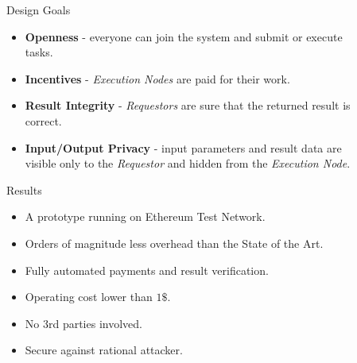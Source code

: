 \documentclass[final]{beamer}
\newlength{\sepwid}
\newlength{\onecolwid}
\newlength{\twocolwid}
\begin{document}
\begin{frame}[t]
\begin{columns}[t]
\begin{column}{\twocolwid}
\noindent\rule{55cm}{0.4pt}


\end{column} %

\begin{column}{\sepwid}\end{column} %

\begin{column}{\onecolwid} %


\begin{block}{Design Goals}
\begin{itemize}
 \item \textbf{Openness} - everyone can join the system and submit or execute tasks. 
 \item \textbf{Incentives} - \emph{Execution Nodes} are paid for their work. 
 \item \textbf{Result Integrity} - \emph{Requestors} are sure that the returned result is correct.
 \item \textbf{Input/Output Privacy} - input parameters and result data are visible only to the \emph{Requestor} and hidden from the \emph{Execution Node}. 
\end{itemize}

\end{block}




\begin{alertblock}{Results}

\begin{itemize}
\item A prototype running on Ethereum Test Network. 
\item Orders of magnitude less overhead than the State of the Art.
\item Fully automated payments and result verification. 
\item Operating cost lower than $1\$$.
\item No 3rd parties involved. 
\item Secure against rational attacker. 
\end{itemize}


\end{alertblock}
\end{column}
\end{columns}
\end{frame}
\end{document}
